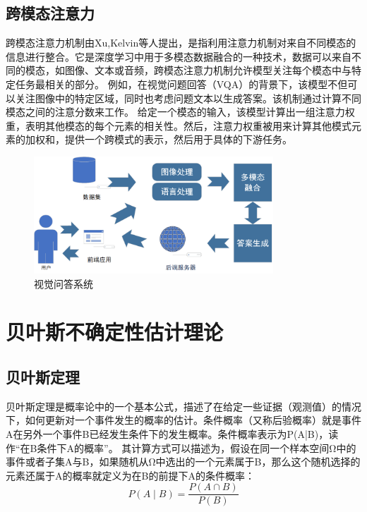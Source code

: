 \subsection{跨模态注意力}
跨模态注意力机制由Xu,Kelvin等人\cite{xu2015show}提出，是指利用注意力机制对来自不同模态的信息进行整合。它是深度学习中用于多模态数据融合的一种技术，数据可以来自不同的模态，如图像、文本或音频，跨模态注意力机制允许模型关注每个模态中与特定任务最相关的部分。
例如，在视觉问题回答（VQA）的背景下，该模型不但可以关注图像中的特定区域，同时也考虑问题文本以生成答案。该机制通过计算不同模态之间的注意分数来工作。
给定一个模态的输入，该模型计算出一组注意力权重，表明其他模态的每个元素的相关性。然后，注意力权重被用来计算其他模式元素的加权和，提供一个跨模式的表示，然后用于具体的下游任务。
\begin{figure}[htbp]
	\centering	
	\includegraphics[width=0.8\textwidth]{Fig/myfig/chapter2/sys_vqa.png}  %
	\caption{\label{sys_need}视觉问答系统} 
\end{figure}

\section{贝叶斯不确定性估计理论}
\subsection{贝叶斯定理}
贝叶斯定理是概率论中的一个基本公式，描述了在给定一些证据（观测值）的情况下，如何更新对一个事件发生的概率的估计。条件概率（又称后验概率）就是事件A在另外一个事件B已经发生条件下的发生概率。条件概率表示为P(A|B)，读作“在B条件下A的概率”。
其计算方式可以描述为，假设在同一个样本空间Ω中的事件或者子集A与B，如果随机从Ω中选出的一个元素属于B，那么这个随机选择的元素还属于A的概率就定义为在B的前提下A的条件概率：
$$
P(A \mid B)=\frac{P(A \cap B)}{P(B)}
$$

